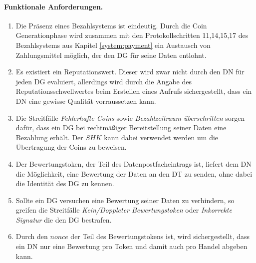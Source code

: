 \documentclass[
	fontsize=11pt,
	headings=small,
	parskip=half,           %
	bibliography=totoc,
	numbers=noenddot,       %
	open=any,               %
]{scrreprt}
\begin{document}
\paragraph{Funktionale Anforderungen.}
\begin{enumerate}
    \item Die Präsenz eines Bezahlsystems ist eindeutig. Durch die Coin Generationphase wird zusammen mit den Protokollschritten 11,14,15,17 des Bezahlsystems aus Kapitel \ref{system:payment} ein Austausch von Zahlungsmittel möglich, der den DG für seine Daten entlohnt.
    \item Es existiert ein Reputationswert. Dieser wird zwar nicht durch den DN für jeden DG evaluiert, allerdings wird durch die Angabe des Reputationsschwellwertes beim Erstellen eines Aufrufs sichergestellt, dass ein DN eine gewisse Qualität vorraussetzen kann.
    \item Die Streitfälle \textit{Fehlerhafte Coins} sowie \textit{Bezahlzeitraum überschritten} sorgen dafür, dass ein DG bei rechtmäßiger Bereitstellung seiner Daten eine Bezahlung erhält. Der $SHK$ kann dabei verwendet werden um die Übertragung der Coins zu beweisen.
    \item Der Bewertungstoken, der Teil des Datenpostfacheintrags ist, liefert dem DN die Möglichkeit, eine Bewertung der Daten an den DT zu senden, ohne dabei die Identität des DG zu kennen.
    \item Sollte ein DG versuchen eine Bewertung seiner Daten zu verhindern, so greifen die Streitfälle \textit{Kein/Doppleter Bewertungstoken} oder \textit{Inkorrekte Signatur} die den DG bestrafen.
    \item Durch den $nonce$ der Teil des Bewertungstokens ist, wird sichergestellt, dass ein DN nur eine Bewertung pro Token und damit auch pro Handel abgeben kann.
\end{enumerate} 
\end{document}
